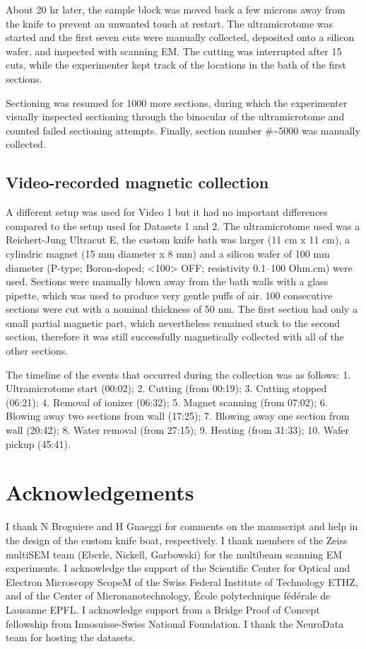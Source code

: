\documentclass{article}
\begin{document}
About 20 hr later, the sample block was moved back a few microns away from the knife to prevent an unwanted touch at restart. The ultramicrotome was started and the first seven cuts were manually collected, deposited onto a silicon wafer, and inspected with scanning EM. The cutting was interrupted after 15 cuts, while the experimenter kept track of the locations in the bath of the first sections.

Sectioning was resumed for 1000 more sections, during which the experimenter visually inspected sectioning through the binocular of the ultramicrotome and counted failed sectioning attempts. Finally, section number \#\textasciitilde5000 was manually collected.

\subsection*{Video-recorded magnetic collection}

A different setup was used for Video 1 but it had no important differences compared to the setup used for Datasets 1 and 2. The ultramicrotome used was a Reichert-Jung Ultracut E, the custom knife bath was larger (11 cm x 11 cm), a cylindric magnet (15 mm diameter x 8 mm) and a silicon wafer of 100 mm diameter (P-type; Boron-doped; <100> OFF; resistivity 0.1–100 Ohm.cm) were used. Sections were manually blown away from the bath walls with a glass pipette, which was used to produce very gentle puffs of air. 100 consecutive sections were cut with a nominal thickness of 50 nm. The first section had only a small partial magnetic part, which nevertheless remained stuck to the second section, therefore it was still successfully magnetically collected with all of the other sections.

The timeline of the events that occurred during the collection was as follows: 1. Ultramicrotome start (00:02); 2. Cutting (from 00:19); 3. Cutting stopped (06:21); 4. Removal of ionizer (06:32); 5. Magnet scanning (from 07:02); 6. Blowing away two sections from wall (17:25); 7. Blowing away one section from wall (20:42); 8. Water removal (from 27:15); 9. Heating (from 31:33); 10. Wafer pickup (45:41).

\section*{Acknowledgements}

I thank N Broguiere and H Gnaeggi for comments on the manuscript and help in the design of the custom knife boat, respectively. I thank members of the Zeiss multiSEM team (Eberle, Nickell, Garbowski) for the multibeam scanning EM experiments. I acknowledge the support of the Scientific Center for Optical and Electron Microscopy ScopeM of the Swiss Federal Institute of Technology ETHZ, and of the Center of Micronanotechnology, École polytechnique fédérale de Lausanne EPFL. I acknowledge support from a Bridge Proof of Concept fellowship from Innosuisse-Swiss National Foundation. I thank the NeuroData team for hosting the datasets.
\end{document}
